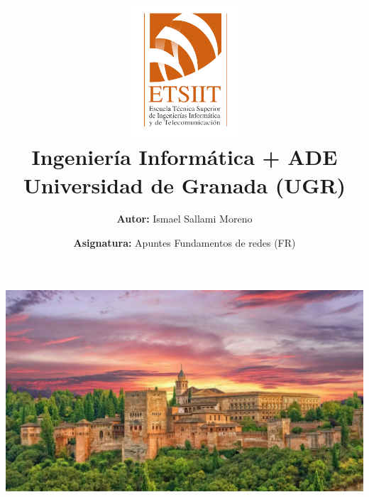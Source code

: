 \documentclass[a4paper,12pt]{article}
\title{
    \vspace{-2cm}
    \includegraphics[width=0.3\textwidth]{images/etsiit.png} \\ %
    \LARGE Ingeniería Informática + ADE\\
    \large Universidad de Granada (UGR)\\[1cm]
}
\author{\textbf{Autor:} Ismael Sallami Moreno}
\date{\textbf{Asignatura:} Apuntes Fundamentos de redes (FR)\\[1cm]}
\begin{document}
\maketitle
\thispagestyle{empty}

\begin{center}
    \includegraphics[width=\textwidth,height=0.4\textheight,keepaspectratio]{images/granada.jpg} \\ %
    \vfill
\end{center}

\newpage

\tableofcontents
\newpage
\end{document}
